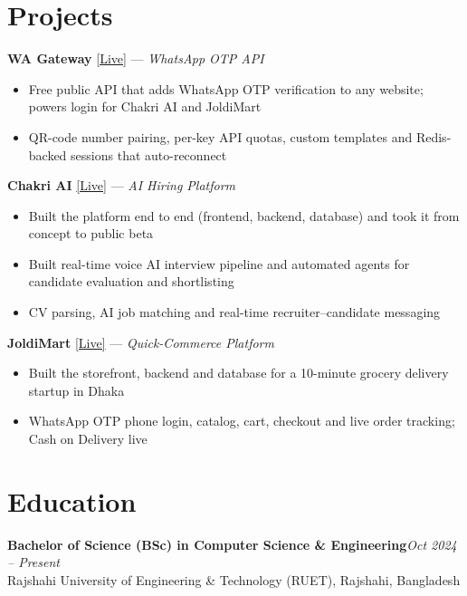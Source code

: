 \documentclass[11pt,a4paper]{article}
\newcommand{\rlink}[2]{\href{#1}{\textcolor{linkblue}{#2}}}
\newcommand{\project}[3]{%
  \vspace{7pt}\textbf{#1} \rlink{#2}{[Live]} --- \textit{#3}\par}
\begin{document}
\section{Projects}
\project{WA Gateway}{https://wa.ars2k03.tech}{WhatsApp OTP API}
\begin{itemize}
  \item Free public API that adds WhatsApp OTP verification to any website; powers login for Chakri AI and JoldiMart
  \item QR-code number pairing, per-key API quotas, custom templates and Redis-backed sessions that auto-reconnect
\end{itemize}
\project{Chakri AI}{https://chakriai.com}{AI Hiring Platform}
\begin{itemize}
  \item Built the platform end to end (frontend, backend, database) and took it from concept to public beta
  \item Built real-time voice AI interview pipeline and automated agents for candidate evaluation and shortlisting
  \item CV parsing, AI job matching and real-time recruiter--candidate messaging
\end{itemize}
\project{JoldiMart}{https://joldimart.com}{Quick-Commerce Platform}
\begin{itemize}
  \item Built the storefront, backend and database for a 10-minute grocery delivery startup in Dhaka
  \item WhatsApp OTP phone login, catalog, cart, checkout and live order tracking; Cash on Delivery live
\end{itemize}

\section{Education}
\textbf{Bachelor of Science (BSc) in Computer Science \& Engineering}\hfill\textit{Oct 2024 -- Present}\\
Rajshahi University of Engineering \& Technology (RUET), Rajshahi, Bangladesh
\end{document}
